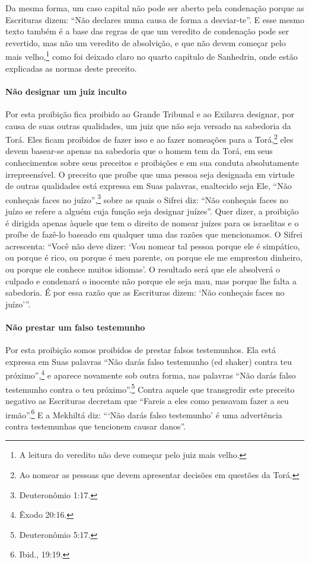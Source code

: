Da mesma forma, um caso capital não pode ser aberto pela condenação
porque as Escrituras dizem: ``Não declares numa causa de forma a
desviar-te''. E esse mesmo texto também é a base das regras de que um
veredito de condenação pode ser revertido, mas não um veredito de
absolvição, e que não devem começar pelo mais
velho,\footnote{A leitura do veredito não deve começar pelo juiz mais velho.} como foi deixado claro no quarto capítulo
de Sanhedrin, onde estão explicadas as normas deste preceito.

\paragraph{Não designar um juiz inculto}

Por esta proibição fica proibido ao Grande Tribunal e ao Exilarca
designar, por causa de suas outras qualidades, um juiz que não seja
versado na sabedoria da Torá. Eles ficam proibidos de fazer isso e ao
fazer nomeações para a Torá,\footnote{Ao nomear as pessoas que devem apresentar decisões em questões da Torá.} eles devem basear-se
apenas na sabedoria que o homem tem da Torá, em seus conhecimentos
sobre seus preceitos e proibições e em sua conduta absolutamente
irrepreensível. O preceito que proíbe que uma pessoa seja designada em
virtude de outras qualidades está expressa em Suas palavras, enaltecido
seja Ele, ``Não conheçais faces no juízo'',\footnote{Deuteronômio 1:17.} sobre
as quais o Sifrei diz: ``Não conheçais faces no juízo se refere a alguém
cuja função seja designar juízes''. Quer dizer, a proibição é dirigida
apenas àquele que tem o direito de nomear juízes para os israelitas e o
proíbe de fazê-lo baseado em qualquer uma das razões que mencionamos. O
Sifrei acrescenta: ``Você não deve dizer: `Vou nomear tal pessoa porque
ele é simpático, ou porque é rico, ou porque é meu parente, ou porque
ele me emprestou dinheiro, ou porque ele conhece muitos idiomas'. O
resultado será que ele absolverá o culpado e condenará o inocente não
porque ele seja mau, mas porque lhe falta a sabedoria. É por essa razão
que as Escrituras dizem: `Não conheçais faces no juízo'''.

\paragraph{Não prestar um falso testemunho}

Por esta proibição somos proibidos de prestar falsos testemunhos. Ela
está expressa em Suas palavras ``Não darás falso testemunho (ed shaker)
contra teu próximo'',\footnote{Êxodo 20:16.} e aparece novamente sob outra
forma, nas palavras ``Não darás falso testemunho contra o teu próximo''.\footnote{Deuteronômio 5:17.} Contra aquele que transgredir este preceito
negativo as Escrituras decretam que ``Fareis a eles como pensavam fazer
a seu irmão''.\footnote{Ibid., 19:19.} E a Mekhiltá diz: ```Não darás falso
testemunho' é uma advertência contra testemunhas que tencionem causar
danos''.

